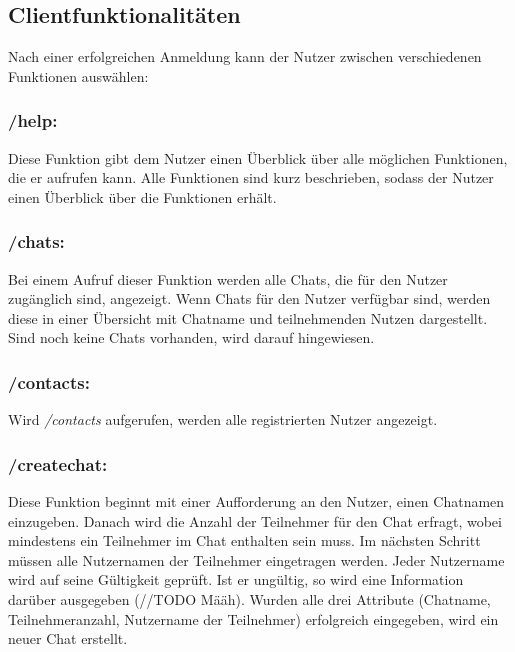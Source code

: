 \author{Jan Grübener, Troy Keßler, Patrick Mischka, Michael Angermeier}
\subsection{Clientfunktionalitäten}
Nach einer erfolgreichen Anmeldung kann der Nutzer zwischen verschiedenen Funktionen auswählen:

\subsubsection*{/help:}
Diese Funktion gibt dem Nutzer einen Überblick über alle möglichen Funktionen, die er aufrufen kann.
Alle Funktionen sind kurz beschrieben, sodass der Nutzer einen Überblick über die Funktionen erhält.

\subsubsection*{/chats:}
Bei einem Aufruf dieser Funktion werden alle Chats, die für den Nutzer zugänglich sind, angezeigt.
Wenn Chats für den Nutzer verfügbar sind, werden diese in einer Übersicht mit Chatname und teilnehmenden Nutzen dargestellt.
Sind noch keine Chats vorhanden, wird darauf hingewiesen.

\subsubsection*{/contacts:}
Wird \textit{/contacts} aufgerufen, werden alle registrierten Nutzer angezeigt.

\subsubsection*{/createchat:}
Diese Funktion beginnt mit einer Aufforderung an den Nutzer, einen Chatnamen einzugeben.
Danach wird die Anzahl der Teilnehmer für den Chat erfragt, wobei mindestens ein Teilnehmer im Chat enthalten sein muss.
Im nächsten Schritt müssen alle Nutzernamen der Teilnehmer eingetragen werden. 
Jeder Nutzername wird auf seine Gültigkeit geprüft. Ist er ungültig, so wird eine Information darüber ausgegeben (//TODO Määh). 
Wurden alle drei Attribute (Chatname, Teilnehmeranzahl, Nutzername der Teilnehmer) erfolgreich eingegeben,
wird ein neuer Chat erstellt.


